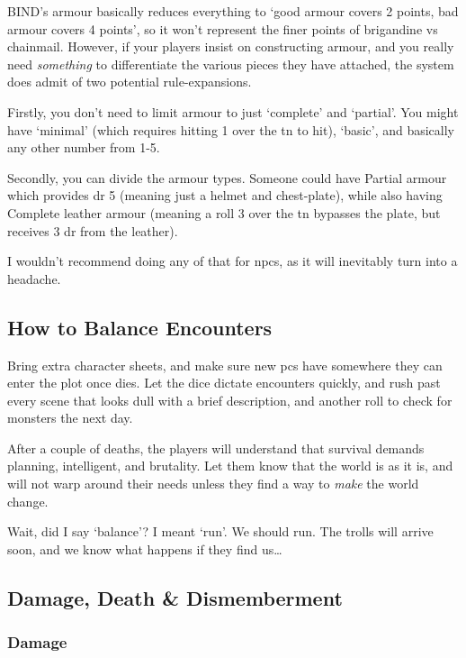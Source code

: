 \begin{multicols}{2}
BIND's armour basically reduces everything to `good armour covers 2 points, bad armour covers 4 points', so it won't represent the finer points of brigandine vs chainmail.
However, if your players insist on constructing armour, and you really need \emph{something} to differentiate the various pieces they have attached, the system does admit of two potential rule-expansions.

Firstly, you don't need to limit armour to just `complete' and `partial'.
You might have `minimal' (which requires hitting 1 over the \gls{tn} to hit), `basic', and basically any other number from 1-5.

Secondly, you can divide the armour types.
Someone could have Partial armour which provides \gls{dr} 5 (meaning just a helmet and chest-plate), while also having Complete leather armour (meaning a roll 3 over the \gls{tn} bypasses the plate, but receives 3 \gls{dr} from the leather).

I wouldn't recommend doing any of that for \glspl{npc}, as it will inevitably turn into a headache.

\subsection{How to Balance Encounters}

Bring extra character sheets, and make sure new \glspl{pc} have somewhere they can enter the plot once  dies.
Let the dice dictate encounters quickly, and rush past every scene that looks dull with a brief description, and another roll to check for monsters the next day.

After a couple of deaths, the players will understand that survival demands planning, intelligent, and brutality.
Let them know that the world is as it is, and will not warp around their needs unless they find a way to \emph{make} the world change.

Wait, did I say `balance'?
I meant `run'.
We should run.
The trolls will arrive soon, and we know what happens if they find us\ldots

\subsection{Damage, Death \& Dismemberment}

\subsubsection{Damage}


\end{multicols}
